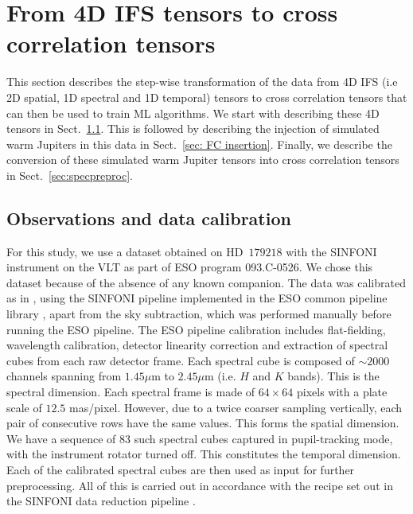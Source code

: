\documentclass{aa}
\begin{document}

\section{From 4D IFS tensors to cross correlation tensors}\label{sec:data}

This section describes the step-wise transformation of the data from 4D IFS (i.e 2D spatial, 1D spectral and 1D temporal) tensors to cross correlation tensors that can then be used to train ML algorithms.
We start with describing these 4D tensors in Sect.~\ref{sec:datadesc}.
This is followed by describing the injection of simulated warm Jupiters in this data in Sect.~\ref{sec: FC insertion}.
Finally, we describe the conversion of these simulated warm Jupiter tensors into cross correlation tensors in Sect.~\ref{sec:specpreproc}.

\subsection{Observations and data calibration}\label{sec:datadesc}

For this study, we use a dataset obtained on HD~$179218$ with the SINFONI instrument on the VLT \citep{2004SINFONI,2003SEisenhauer} as part of ESO program 093.C-0526.
We chose this dataset because of the absence of any known companion.
The data was calibrated as in \citet{2018A&ChristiaensHD142527}, using the SINFONI pipeline implemented in the ESO common pipeline library \citep[EsoRex version 3.10.2;][]{2006Abuter}, apart from the sky subtraction, which was performed manually before running the ESO pipeline.
The ESO pipeline calibration includes flat-fielding, wavelength calibration, detector linearity correction and extraction of spectral cubes from each raw detector frame. 
Each spectral cube is composed of $\sim 2000$ channels spanning from $1.45\mu$m to $2.45 \mu$m (i.e. $H$ and $K$ bands).
This is the spectral dimension.
Each spectral frame is made of $64\times64$ pixels with a plate scale of $12.5$ mas/pixel. However, due to a twice coarser sampling vertically, each pair of consecutive rows have the same values.
This forms the spatial dimension.
We have a sequence of $83$ such spectral cubes captured in pupil-tracking mode, with the instrument rotator turned off.
This constitutes the temporal dimension.
Each of the calibrated spectral cubes are then used as input for further preprocessing.
All of this is carried out in accordance with the recipe set out in the SINFONI data reduction pipeline \citep{2006Abuter}.
\end{document}
